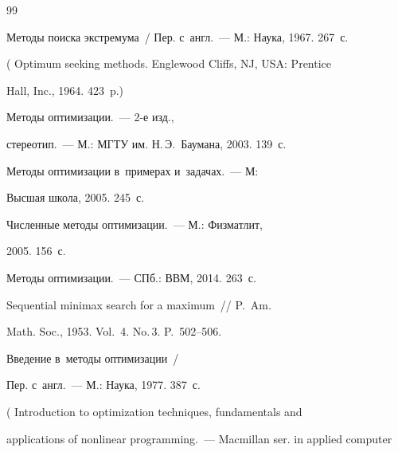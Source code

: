 {\small\frenchspacing


{%




\begin{thebibliography}{99}










 Методы поиска экстремума~/ Пер. с~англ.~--- М.: Наука, 1967. 267~с.


( {Optimum seeking methods}. Englewood Cliffs, NJ, USA: Prentice 


Hall, Inc., 1964. 423~p.)










 Методы оптимизации.~--- 2-е изд., 


стереотип.~--- М.: МГТУ им. Н.\,Э.~Баумана, 2003. 139~с.




 Методы оптимизации в~примерах и~задачах.~--- М: 


Высшая школа, 2005. 245~с.




 Численные методы оптимизации.~--- М.: Физ\-мат\-лит, 


2005. 156~с.




 Методы оптимизации.~--- СПб.: ВВМ, 2014. 263~с.




 Sequential minimax search for a maximum~/\!\!/ P.~Am. 


Math. Soc., 1953. Vol.~4. No.\,3. P.~502--506.




 Введение в~методы оптимизации~/


Пер. с~англ.~--- М.: Наука, 1977. 387~с. 


( Introduction to optimization techniques, fundamentals and 


applications of nonlinear programming.~--- Macmillan ser. in applied computer 



\end{thebibliography}}}
